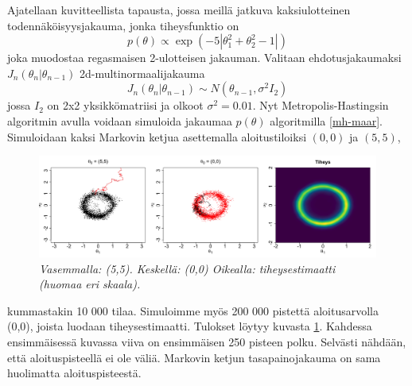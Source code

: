 \begin{esim}\label{mh-esim1}
	Ajatellaan kuvitteellista tapausta, jossa meillä jatkuva kaksiulotteinen todennäköisyysjakauma, jonka tiheysfunktio on 
	\begin{equation}
		p(\theta) \varpropto \exp(-5 |\theta_1^2+\theta_2^2-1|)
	\end{equation}
	joka muodostaa regasmaisen 2-ulotteisen jakauman. Valitaan ehdotusjakaumaksi $J_n(\theta_n|\theta_{n-1})$ 2d-multinormaalijakauma 
	\begin{equation}
		J_n(\theta_n|\theta_{n-1}) \sim N(\theta_{n-1}, \sigma^2 I_2)
	\end{equation}
	jossa $I_2$ on 2x2 yksikkömatriisi ja olkoot $\sigma^2 = 0.01$. Nyt Metropolis-Hastingsin algoritmin avulla voidaan simuloida jakaumaa $p(\theta)$ algoritmilla \ref{mh-maar}. Simuloidaan kaksi Markovin ketjua asettemalla aloitustiloiksi $(0,0)$ ja $(5,5)$, 
	\begin{figure}[h!]
		\includegraphics[width=\textwidth]{mhexample1}
		\caption[Kaksiulotteinen Metropolis--Hastings esimerkki]{\textit{Vasemmalla: (5,5). Keskellä: (0,0) Oikealla: tiheysestimaatti (huomaa eri skaala).}}
		\label{kuva1}
	\end{figure}
	kummastakin 10 000 tilaa. Simuloimme myös 200 000 pistettä aloitusarvolla (0,0), joista luodaan tiheysestimaatti. Tulokset löytyy kuvasta \ref{kuva1}. Kahdessa ensimmäisessä kuvassa viiva on ensimmäisen 250 pisteen polku. Selvästi nähdään, että aloituspisteellä ei ole väliä. Markovin ketjun tasapainojakauma on sama huolimatta aloituspisteestä.
	
\end{esim}

